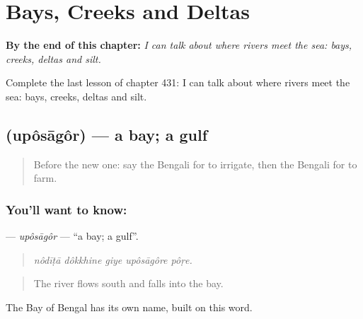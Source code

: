 
\chapter{Bays, Creeks and Deltas}
\label{ch:bn-bays-creeks-and-deltas}

\begin{chapteropening}
\textbf{By the end of this chapter:} \emph{I can talk about where rivers meet the sea: bays, creeks, deltas and silt.}

Complete the last lesson of chapter 431: I can talk about where rivers meet the sea: bays, creeks, deltas and silt.
\end{chapteropening}

\section[\texorpdfstring{\bn{উপসাগর} (upôsāgôr)}{উপসাগর (upôsāgôr)}]{ (upôsāgôr) — a bay; a gulf}

\label{lesson:BN-C431-uposagor}



\begin{quote}
Before the new one: say the Bengali for to irrigate, then the Bengali for to farm.
\end{quote}

\subsection*{You'll want to know: }
\textbf{} — \emph{upôsāgôr} — \textquotedblleft{}a bay; a gulf\textquotedblright{}.

\begin{quote}
    
\end{quote}

\begin{quote}
\emph{nôdīṭā dôkkhine giye upôsāgôre pôṛe.}
\end{quote}

\begin{quote}
The river flows south and falls into the bay.
\end{quote}

The Bay of Bengal has its own name, built on this word.


